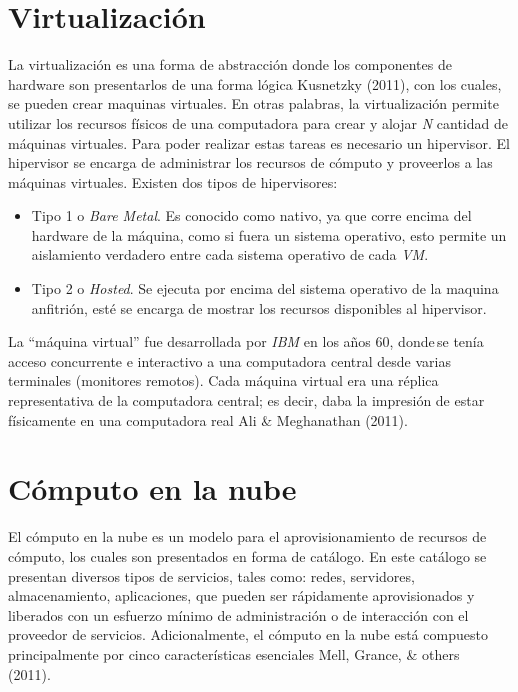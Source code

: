 \documentclass[12pt,twoside]{reedthesis}
\theoremstyle{definition}
\theoremstyle{definition}
\theoremstyle{definition}
\theoremstyle{remark}
\begin{document}
\hypertarget{virtualizacion}{%
\section{Virtualización}\label{virtualizacion}}

La virtualización es una forma de abstracción donde los componentes de
hardware son presentarlos de una forma lógica Kusnetzky (2011), con los
cuales, se pueden crear maquinas virtuales. En otras palabras, la
virtualización permite utilizar los recursos físicos de una computadora
para crear y alojar \emph{N} cantidad de máquinas virtuales. Para poder
realizar estas tareas es necesario un hipervisor. El hipervisor se
encarga de administrar los recursos de cómputo y proveerlos a las
máquinas virtuales. Existen dos tipos de hipervisores:
\begin{itemize}
\item
  Tipo 1 o \emph{Bare Metal}. Es conocido como nativo, ya que corre
  encima del hardware de la máquina, como si fuera un sistema operativo,
  esto permite un aislamiento verdadero entre cada sistema operativo de
  cada \emph{VM}.
\item
  Tipo 2 o \emph{Hosted}. Se ejecuta por encima del sistema operativo de
  la maquina anfitrión, esté se encarga de mostrar los recursos
  disponibles al hipervisor.
\end{itemize}
La ``máquina virtual'' fue desarrollada por \emph{IBM} en los años 60,
donde\,se tenía acceso concurrente e interactivo a una computadora
central desde varias terminales (monitores remotos). Cada máquina
virtual era una réplica representativa de la computadora central; es
decir, daba la impresión de estar físicamente en una computadora real
Ali \& Meghanathan (2011).~

\hypertarget{computo-en-la-nube}{%
\section{Cómputo en la nube}\label{computo-en-la-nube}}

El cómputo en la nube es un modelo para el aprovisionamiento de recursos
de cómputo, los cuales son presentados en forma de catálogo. En este
catálogo se presentan diversos tipos de servicios, tales como: redes,
servidores, almacenamiento, aplicaciones, que pueden ser rápidamente
aprovisionados y liberados con un esfuerzo mínimo de administración o de
interacción con el proveedor de servicios. Adicionalmente, el cómputo en
la nube está compuesto principalmente por cinco características
esenciales Mell, Grance, \& others (2011).~~
\end{document}
